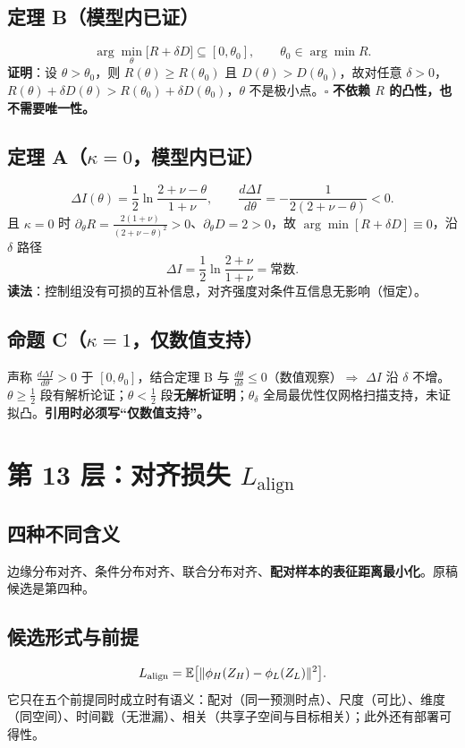\documentclass[UTF8,11pt,a4paper]{ctexart}
\newcommand{\E}{\mathbb{E}}
\begin{document}
\subsection{定理 B（模型内已证）}
\[
\arg\min_{\theta}\big[R+\delta D\big]\subseteq[0,\theta_0],\qquad \theta_0\in\arg\min R .
\]
\textbf{证明}：设 $\theta>\theta_0$，则 $R(\theta)\ge R(\theta_0)$ 且 $D(\theta)>D(\theta_0)$，故对任意 $\delta>0$，$R(\theta)+\delta D(\theta)>R(\theta_0)+\delta D(\theta_0)$，$\theta$ 不是极小点。$\square$
\textbf{不依赖 $R$ 的凸性，也不需要唯一性。}

\subsection{定理 A（$\kappa=0$，模型内已证）}
\begin{equation}
\Delta I(\theta)=\frac12\ln\frac{2+\nu-\theta}{1+\nu},\qquad
\frac{d\Delta I}{d\theta}=-\frac{1}{2(2+\nu-\theta)}<0 .
\end{equation}
且 $\kappa=0$ 时 $\partial_\theta R=\frac{2(1+\nu)}{(2+\nu-\theta)^2}>0$、$\partial_\theta D=2>0$，故 $\arg\min[R+\delta D]\equiv0$，沿 $\delta$ 路径
\[
\Delta I=\frac12\ln\frac{2+\nu}{1+\nu}=\text{常数}.
\]
\textbf{读法}：控制组没有可损的互补信息，对齐强度对条件互信息无影响（恒定）。

\subsection{命题 C（$\kappa=1$，仅数值支持）}
声称 $\frac{d\Delta I}{d\theta}>0$ 于 $[0,\theta_0]$，结合定理 B 与 $\frac{d\theta}{d\delta}\le0$（数值观察）$\Rightarrow$ $\Delta I$ 沿 $\delta$ 不增。
$\theta\ge\frac12$ 段有解析论证；$\theta<\frac12$ 段\textbf{无解析证明}；$\theta_\delta$ 全局最优性仅网格扫描支持，未证拟凸。\textbf{引用时必须写``仅数值支持''。}

\section{第 13 层：对齐损失 $L_{\text{align}}$}

\subsection{四种不同含义}
边缘分布对齐、条件分布对齐、联合分布对齐、\textbf{配对样本的表征距离最小化}。原稿候选是第四种。

\subsection{候选形式与前提}
\begin{equation}
L_{\rm align}=\E\big[\|\phi_H(Z_H)-\phi_L(Z_L)\|^2\big]. \label{eq:align}
\end{equation}
它只在五个前提同时成立时有语义：配对（同一预测时点）、尺度（可比）、维度（同空间）、时间戳（无泄漏）、相关（共享子空间与目标相关）；此外还有部署可得性。
\end{document}
